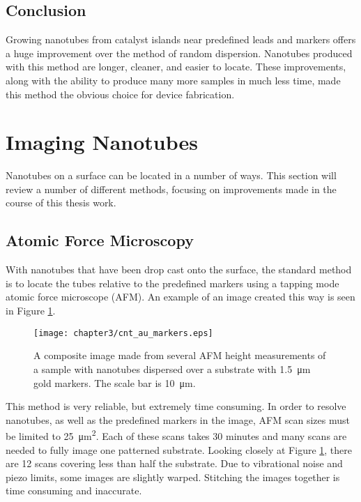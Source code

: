 \subsection{Conclusion}

Growing nanotubes from catalyst islands near predefined leads and markers offers a huge improvement over the method of random dispersion. Nanotubes produced with this method are longer, cleaner, and easier to locate. These improvements, along with the ability to produce many more samples in much less time, made this method the obvious choice for device fabrication.

\section{Imaging Nanotubes}
\label{subsubsec:imaging_disperse}

Nanotubes on a  surface can be located in a number of ways. This section will review a number of different methods, focusing on improvements made in the course of this thesis work.

\subsection{Atomic Force Microscopy}

With nanotubes that have been drop cast onto the surface, the standard method is to locate the tubes relative to the predefined markers using a tapping mode atomic force microscope (AFM). An example of an image created this way is seen in Figure \ref{fig:cnt_au_markers}. 

\begin{figure}
	\centering
	\texttt{[image: chapter3/cnt\_au\_markers.eps]}
	\caption{A composite image made from several AFM height measurements of a sample with nanotubes dispersed over a  substrate with \SI{1.5}{\micro\meter} gold markers. The scale bar is \SI{10}{\micro\meter}.}
	\label{fig:cnt_au_markers}
\end{figure}

This method is very reliable, but extremely time consuming. In order to resolve nanotubes, as well as the predefined markers in the image, AFM scan sizes must be limited to \SI{25}{\square\micro\meter}. Each of these scans takes 30 minutes and many scans are needed to fully image one patterned substrate. Looking closely at Figure \ref{fig:cnt_au_markers}, there are 12 scans covering less than half the substrate. Due to vibrational noise and piezo limits, some images are slightly warped. Stitching the images together is time consuming and inaccurate.

